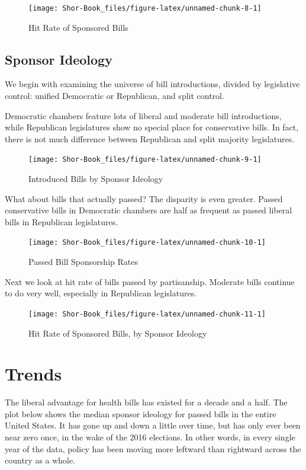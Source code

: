 \documentclass[
  oneside]{book}
\begin{document}
\begin{figure}
\texttt{[image: Shor-Book\_files/figure-latex/unnamed-chunk-8-1]} \caption{Hit Rate of Sponsored Bills}\label{fig:unnamed-chunk-8}
\end{figure}

\hypertarget{sponsor-ideology}{%
\subsection{Sponsor Ideology}\label{sponsor-ideology}}

We begin with examining the universe of bill introductions, divided by legislative control: unified Democratic or Republican, and split control.

Democratic chambers feature lots of liberal and moderate bill introductions, while Republican legislatures show no special place for conservative bills. In fact, there is not much difference between Republican and split majority legislatures.

\begin{figure}
\texttt{[image: Shor-Book\_files/figure-latex/unnamed-chunk-9-1]} \caption{Introduced Bills by Sponsor Ideology}\label{fig:unnamed-chunk-9}
\end{figure}

What about bills that actually passed? The disparity is even greater. Passed conservative bills in Democratic chambers are half as frequent as passed liberal bills in Republican legislatures.

\begin{figure}
\texttt{[image: Shor-Book\_files/figure-latex/unnamed-chunk-10-1]} \caption{Passed Bill Sponsorship Rates}\label{fig:unnamed-chunk-10}
\end{figure}

Next we look at hit rate of bills passed by partisanship. Moderate bills continue to do very well, especially in Republican legislatures.

\begin{figure}
\texttt{[image: Shor-Book\_files/figure-latex/unnamed-chunk-11-1]} \caption{Hit Rate of Sponsored Bills, by Sponsor Ideology}\label{fig:unnamed-chunk-11}
\end{figure}

\hypertarget{trends}{%
\section{Trends}\label{trends}}

The liberal advantage for health bills has existed for a decade and a half. The plot below shows the median sponsor ideology for passed bills in the entire United States. It has gone up and down a little over time, but has only ever been near zero once, in the wake of the 2016 elections. In other words, in every single year of the data, policy has been moving more leftward than rightward across the country as a whole.
\end{document}
